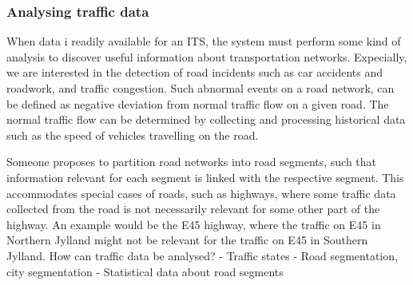 \subsubsection*{Analysing traffic data}
When data i readily available for an ITS, the system must perform some kind of analysis to discover useful information about transportation networks. Expecially, we are interested in the detection of road incidents such as car accidents and roadwork, and traffic congestion. Such abnormal events on a road network, can be defined as negative deviation from normal traffic flow on a given road. The normal traffic flow can be determined by collecting and processing historical data such as the speed of vehicles travelling on the road.


Someone proposes to partition road networks into road segments, such that information relevant for each segment is linked with the respective segment. This accommodates special cases of roads, such as highways, where some traffic data collected from the road is not necessarily relevant for some other part of the highway. An example would be the E45 highway, where the traffic on E45 in Northern Jylland might not be relevant for the traffic on E45 in Southern Jylland.
How can traffic data be analysed?
- Traffic states
- Road segmentation, city segmentation
- Statistical data about road segments 